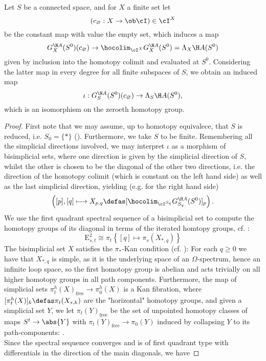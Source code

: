 \begin{lem}\label{lem_pi_0_loday_HA_A}
Let $S$ be a connected space, and for $X$ a finite set let
	\[(c_\varnothing: X \to \ob \cI) \in \cI^X\]
be the constant map with value the empty set, which induces a map
\[
	G_X^{\H A}(S^0)(c_\varnothing) \to \hocolim_{\cI^X} G_X^{\H A}(S^0) = %
	\Lambda_X \H A (S^0)
\]
given by inclusion into the homotopy colimit and evaluated at $S^0$. Considering the latter map in every degree for all finite subspaces of $S$, we obtain an induced map
  \[	\iota: G^{\H A}_S (S^0) (c_\varnothing) \to \Lambda_S \H A (S^0), \]
which is an isomorphism on the zeroeth homotopy group.
\begin{proof}
First note that we may assume, up to homotopy equivalece, that $S$ is reduced, i.e. $S_0 = \{\ast\}$ (). Furthermore, we take $S$ to be finite. Remembering all the simplicial directions involved, we may interpret $\iota$ as a morphism of bisimplicial sets, where one direction is given by the simplicial direction of $S$, whilst the other is chosen to be the diagonal of the other two directions, i.e. the direction of the homotopy colimit (which is constant on the left hand side) as well as the last simplicial direction, yielding (e.g. for the right hand side) %
	\[ \left( [p],[q] \longmapsto X_{p,q} \defas [\hocolim_{\cI^{S_q}} G^{\H A}_{S_q} (S^0)]_p \right) . \]
We use the first quadrant spectral sequence of a bisimplicial set to compute the homotopy groups of its diagonal in terms of the iterated homtopy groups, cf. \cite[Thm. B5]{bousfield1978homotopy}:
	\[	\mathrm{E}^2_{s,t} %
	\cong \pi_t \left\{ [q] \mapsto \pi_s(X_{\ast,q}) \right\}	\]
The bisimplicial set $X$ satisfies the $\pi_*$-Kan condition (cf. \cite[B.3.1]{bousfield1978homotopy}): For each $q \geq 0$ we have that $X_{\ast, q}$ is simple, as it is the underlying space of an $\Omega$-spectrum, hence an infinite loop space, so the first homotopy group is abelian and acts trivially on all higher homotopy groups in all path components. Furthermore, the map of simplicial sets $\pi_t^h(X)_{\mathrm{free}} \to \pi_0^h (X)$ is a Kan fibration, where $[\pi_t^h(X)]_k \defas \pi_t(X_{\ast,k})$ are the "horizontal" homotopy groups, and given a simplicial set $Y$, we let $\pi_t (Y)_\mathrm{free}$ be the set of unpointed homotopy classes of maps $S^t \to \abs{Y}$ with $\pi_t(Y)_\mathrm{free} \to \pi_0(Y)$ induced by collapsing $Y$ to its path-components: .\\
Since the spectral sequence converges and is of first quadrant type with differentials in the direction of the main diagonals, we have

\end{proof}
\end{lem}
